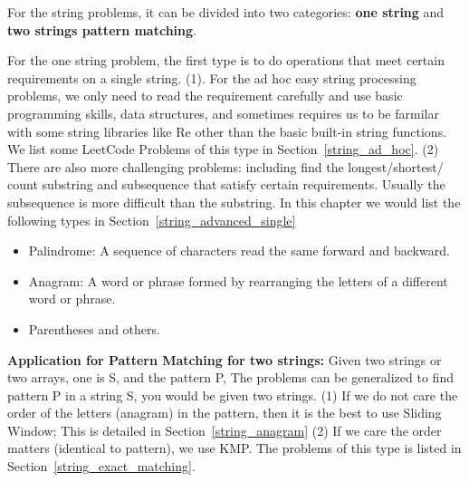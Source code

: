 \documentclass[../main.tex]{subfiles}
\begin{document}
For the string problems, it can be divided into two categories: \textbf{one string} and \textbf{two strings pattern matching}. 

For the one string problem, the first type is to do operations that meet certain requirements on a single string. (1). For the ad hoc easy string processing problems, we only need to read the requirement carefully and use basic programming skills, data structures, and sometimes requires us to be farmilar with some string libraries like Re other than the basic built-in string functions. We list some LeetCode Problems of this type in Section~\ref{string_ad_hoc}. (2) There are also more challenging problems: including find the longest/shortest/ count substring and subsequence that satisfy certain requirements. Usually the subsequence is more difficult than the substring. In this chapter we would list the following types in Section~\ref{string_advanced_single}
\begin{itemize}
    \item Palindrome: A sequence of characters read the same forward and backward.
    \item Anagram: A word or phrase formed by rearranging the letters of a different word or phrase.
    \item Parentheses and others. 
\end{itemize}


\textbf{Application for Pattern Matching for two strings:} Given two strings or two arrays, one is S, and the pattern P, The problems can be generalized to find pattern P in a string S, you would be given two strings. (1) If we do not care the order of the letters (anagram) in the pattern, then it is the best to use Sliding Window; This is detailed in Section~\ref{string_anagram} (2) If we care the order matters (identical to pattern), we use KMP. The problems of this type is listed in Section~\ref{string_exact_matching}.

\end{document}
